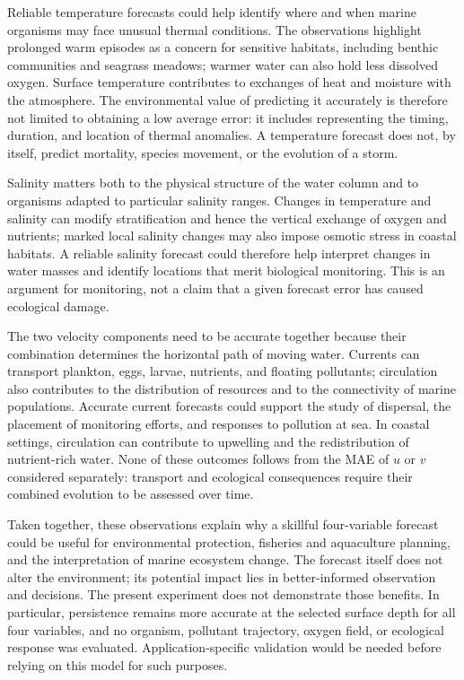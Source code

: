 Reliable temperature forecasts could help identify where and when marine organisms may face unusual thermal conditions. The observations highlight prolonged warm episodes as a concern for sensitive habitats, including benthic communities and seagrass meadows; warmer water can also hold less dissolved oxygen. Surface temperature contributes to exchanges of heat and moisture with the atmosphere. The environmental value of predicting it accurately is therefore not limited to obtaining a low average error: it includes representing the timing, duration, and location of thermal anomalies. A temperature forecast does not, by itself, predict mortality, species movement, or the evolution of a storm.

Salinity matters both to the physical structure of the water column and to organisms adapted to particular salinity ranges. Changes in temperature and salinity can modify stratification and hence the vertical exchange of oxygen and nutrients; marked local salinity changes may also impose osmotic stress in coastal habitats. A reliable salinity forecast could therefore help interpret changes in water masses and identify locations that merit biological monitoring. This is an argument for monitoring, not a claim that a given forecast error has caused ecological damage.

The two velocity components need to be accurate together because their combination determines the horizontal path of moving water. Currents can transport plankton, eggs, larvae, nutrients, and floating pollutants; circulation also contributes to the distribution of resources and to the connectivity of marine populations. Accurate current forecasts could support the study of dispersal, the placement of monitoring efforts, and responses to pollution at sea. In coastal settings, circulation can contribute to upwelling and the redistribution of nutrient-rich water. None of these outcomes follows from the MAE of $u$ or $v$ considered separately: transport and ecological consequences require their combined evolution to be assessed over time.

Taken together, these observations explain why a skillful four-variable forecast could be useful for environmental protection, fisheries and aquaculture planning, and the interpretation of marine ecosystem change. The forecast itself does not alter the environment; its potential impact lies in better-informed observation and decisions. The present experiment does not demonstrate those benefits. In particular, persistence remains more accurate at the selected surface depth for all four variables, and no organism, pollutant trajectory, oxygen field, or ecological response was evaluated. Application-specific validation would be needed before relying on this model for such purposes.

